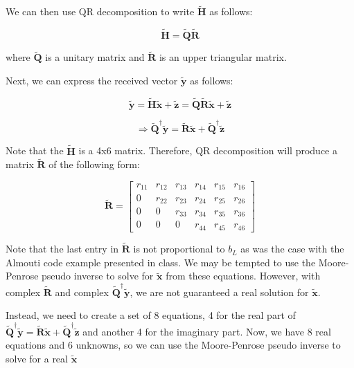 \documentclass[fleqn]{article}
\begin{document}
\begin{enumerate}
\begin{enumerate}
			We can then use QR decomposition to write $\mathbf{\tilde{H}}$ as follows:
			
			\begin{equation*}
				\mathbf{\tilde{H}} = \mathbf{\tilde{Q}}\mathbf{\tilde{R}}
			\end{equation*}
			
			where $\mathbf{\tilde{Q}}$ is a unitary matrix and $\mathbf{\tilde{R}}$ is an upper triangular matrix.
		
			Next, we can express the received vector $\mathbf{\tilde{y}}$ as follows:
		
			\begin{equation*}
				\mathbf{\tilde{y}} = \mathbf{\tilde{H}\tilde{x}} + \mathbf{\tilde{z}} = \mathbf{\tilde{Q}\tilde{R}\tilde{x}} + \mathbf{\tilde{z}}
			\end{equation*}
		
			\begin{equation*}
				\Rightarrow \mathbf{\tilde{Q}^{\dagger}\tilde{y}} = \mathbf{\tilde{R}\tilde{x}} + \mathbf{\tilde{Q}^{\dagger}\tilde{z}}
			\end{equation*}
		
			Note that the $\mathbf{\tilde{H}}$ is a 4x6 matrix. Therefore, QR decomposition will produce a matrix $\mathbf{\tilde{R}}$ of the following form:
		
			\begin{equation*}
				\mathbf{\tilde{R}} = \begin{bmatrix}
					r_{11} & r_{12} & r_{13} & r_{14} & r_{15} & r_{16}\\
					0      & r_{22} & r_{23} & r_{24} & r_{25} & r_{26}\\
					0      & 0      & r_{33} & r_{34} & r_{35} & r_{36}\\
					0      & 0      & 0      & r_{44} & r_{45} & r_{46}
				\end{bmatrix}
			\end{equation*}
			
			Note that the last entry in $\mathbf{\tilde{R}}$ is not proportional to $b_L$ as was the case with the Almouti code example presented in class. We may be tempted to use the Moore-Penrose pseudo inverse to solve for $\mathbf{\tilde{x}}$ from these equations. However, with complex $\mathbf{\tilde{R}}$ and complex $\mathbf{\tilde{Q}^{\dagger}\tilde{y}}$, we are not guaranteed a real solution for $\mathbf{\tilde{x}}$.
			
			Instead, we need to create a set of 8 equations, 4 for the real part of $\mathbf{\tilde{Q}^{\dagger}\tilde{y}} = \mathbf{\tilde{R}\tilde{x}} + \mathbf{\tilde{Q}^{\dagger}\tilde{z}}$ and another 4 for the imaginary part. Now, we have 8 real equations and 6 unknowns, so we can use the Moore-Penrose pseudo inverse to solve for a real $\mathbf{\tilde{x}}$
		

\end{enumerate}
\end{enumerate}
\end{document}
